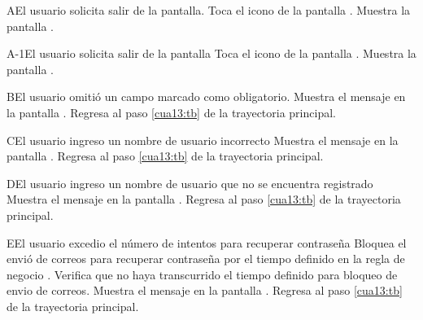  \begin{UCtrayectoriaA}{A}{El usuario solicita salir de la pantalla.}
    \UCpaso[\UCactor] Toca el icono \btnRegresar de la pantalla .
	\UCpaso[\UCsist] Muestra la pantalla .
 \end{UCtrayectoriaA}

 \begin{UCtrayectoriaA}{A-1}{El usuario solicita salir de la pantalla}
	\UCpaso[\UCactor] Toca el icono \btnRegresar de la pantalla .
    \UCpaso[\UCsist] Muestra la pantalla .
\end{UCtrayectoriaA}

 \begin{UCtrayectoriaA}{B}{El usuario omitió un campo marcado como obligatorio.}
 	\UCpaso[\UCsist] Muestra el mensaje  en la pantalla .
	\UCpaso[] Regresa al paso \ref{cua13:tb} de la trayectoria principal. 
	
\end{UCtrayectoriaA}


 \begin{UCtrayectoriaA}{C}{El usuario ingreso un nombre de usuario incorrecto}
	\UCpaso[\UCsist] Muestra el mensaje  en la pantalla .
	\UCpaso[] Regresa al paso \ref{cua13:tb} de la trayectoria principal. 
\end{UCtrayectoriaA}

 \begin{UCtrayectoriaA}{D}{El usuario ingreso un nombre de usuario que no se encuentra registrado}
	\UCpaso[\UCsist] Muestra el mensaje  en la pantalla .
	\UCpaso[] Regresa al paso \ref{cua13:tb} de la trayectoria principal. 
	
\end{UCtrayectoriaA}

 \begin{UCtrayectoriaA}{E}{El usuario excedio el número de intentos para recuperar contraseña}
    \UCpaso[\UCsist] Bloquea el envió de correos para recuperar contraseña por el tiempo definido en la regla de negocio .
    \UCpaso[\UCsist] Verifica que no haya transcurrido el tiempo definido para bloqueo de envio de correos.
    \UCpaso[\UCsist] Muestra el mensaje  en la pantalla .
    \UCpaso[] Regresa al paso \ref{cua13:tb} de la trayectoria principal. 
    
\end{UCtrayectoriaA}

